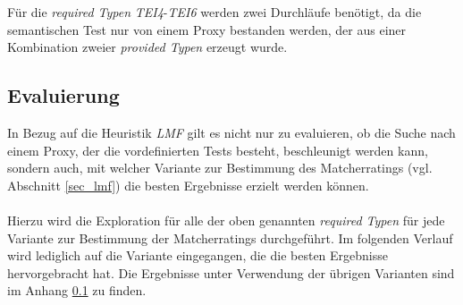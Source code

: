\begin{multicols}{3}
\columnbreak
{}\columnbreak
{}
\end{multicols}
\noindent
Für die \emph{required Typen} \emph{TEI4}-\emph{TEI6} werden zwei Durchläufe benötigt, da die semantischen Test nur von einem Proxy bestanden werden, der aus einer Kombination zweier \emph{provided Typen} erzeugt wurde.

\subsection{Evaluierung}
In Bezug auf die Heuristik \emph{LMF} gilt es nicht nur zu evaluieren, ob die Suche nach einem Proxy, der die vordefinierten Tests besteht, beschleunigt werden kann, sondern auch, mit welcher Variante zur Bestimmung des Matcherratings (vgl. Abschnitt \ref{sec_lmf}) die besten Ergebnisse erzielt werden können. 
\\\\
Hierzu wird die Exploration für alle der oben genannten \emph{required Typen} für jede Variante zur Bestimmung der Matcherratings durchgeführt. Im folgenden Verlauf wird lediglich auf die Variante eingegangen, die die besten Ergebnisse hervorgebracht hat. Die Ergebnisse unter Verwendung der übrigen Varianten sind im Anhang \ref{} zu finden.


